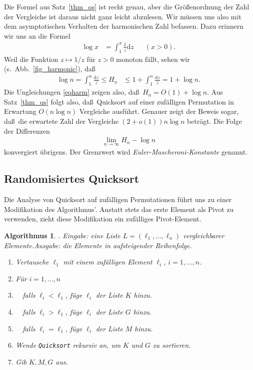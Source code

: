 \documentclass[10pt,reqno]{amsart}
\numberwithin{equation}{section}
\newcommand\dd{{\mathrm d}}
\newtheorem{algorithm}[definition]{Algorithmus}
\newcommand\Thm{Satz}
\begin{document}
Die Formel aus \Thm~\ref{thm_qs} ist recht genau, aber die Gr\"o\ss enordnung der Zahl der Vergleiche ist daraus nicht ganz leicht abzulesen.
Wir m\"ussen uns also mit dem asymptotischen Verhalten der harmonischen Zahl befassen.
Dazu erinnern wir uns an die Formel
\begin{align}\label{eqlog}
	\log x&=\int_1^x\frac1z\dd z&&(x>0).
\end{align}
Weil die Funktion $z\mapsto 1/z$ f\"ur $z>0$ monoton f\"allt, sehen wir (s.\ Abb.~\ref{fig_harmonic}), da\ss
\begin{align}\label{eqharm}
	\log n=\int_1^n\frac{\dd z}z\leq H_n&\leq1+\int_1^n\frac{\dd z}z=1+\log n.
\end{align}
Die Ungleichungen \eqref{eqharm} zeigen also, da\ss\ $H_n=O(1)+\log n$.
Aus \Thm~\ref{thm_qs} folgt also, da\ss\ Quicksort auf einer zuf\"alligen Permutation in Erwartung $O(n\log n)$ Vergleiche ausf\"uhrt.
Genauer zeigt der Beweis sogar, da\ss\ die erwartete Zahl der Vergleiche $(2+o(1))n\log n$ betr\"agt.
Die Folge der Differenzen
	\begin{align*}
		\lim_{n\to\infty}H_n-\log n
	\end{align*}
konvergiert \"ubrigens.
Der Grenzwert wird {\em Euler-Mascheroni-Konstante} genannt.

\subsection{Randomisiertes Quicksort}\label{sec_randomised_qs}
Die Analyse von Quicksort auf zuf\"alligen Permutationen f\"uhrt uns zu einer Modifikation des Algorithmus'.
Anstatt stets das erste Element als Pivot zu verwenden, zieht diese Modifikation ein zuf\"alliges Pivot-Element.

\begin{algorithm}. {\em Eingabe:} eine Liste $L=(\ell_1,\ldots,\ell_n)$ vergleichbarer Elemente.\label{alg_rqs}
	{\em Ausgabe:} die Elemente in aufsteigender Reihenfolge.
	\begin{enumerate}
		\item Vertausche $\ell_1$ mit einem zuf\"alligen Element $\ell_i$, $i=1,\ldots,n$.
		\item F\"ur $i=1,\ldots,n$
		\item $\quad$falls $\ell_i<\ell_1$, f\"uge $\ell_i$ der Liste $K$ hinzu.
		\item $\quad$falls $\ell_i>\ell_1$, f\"uge $\ell_i$ der Liste $G$ hinzu.
		\item $\quad$falls $\ell_i=\ell_1$, f\"uge $\ell_i$ der Liste $M$ hinzu.
		\item Wende {\tt Quicksort} rekursiv an, um $K$ und $G$ zu sortieren.
		\item Gib $K,M,G$ aus.
	\end{enumerate}
\end{algorithm}
\end{document}
